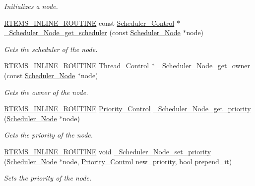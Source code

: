 \begin{DoxyCompactItemize}
\begin{DoxyCompactList}\small\item\em Initializes a node. \end{DoxyCompactList}\item 
\mbox{\hyperlink{group__RTEMSScoreBaseDefs_gac216239df231d5dbd15e3520b0b9313f}{R\+T\+E\+M\+S\+\_\+\+I\+N\+L\+I\+N\+E\+\_\+\+R\+O\+U\+T\+I\+NE}} const \mbox{\hyperlink{struct__Scheduler__Control}{Scheduler\+\_\+\+Control}} $\ast$ \mbox{\hyperlink{group__RTEMSScoreScheduler_ga5098a62702f588f64b5944aef720017d}{\+\_\+\+Scheduler\+\_\+\+Node\+\_\+get\+\_\+scheduler}} (const \mbox{\hyperlink{structScheduler__Node}{Scheduler\+\_\+\+Node}} $\ast$node)
\begin{DoxyCompactList}\small\item\em Gets the scheduler of the node. \end{DoxyCompactList}\item 
\mbox{\hyperlink{group__RTEMSScoreBaseDefs_gac216239df231d5dbd15e3520b0b9313f}{R\+T\+E\+M\+S\+\_\+\+I\+N\+L\+I\+N\+E\+\_\+\+R\+O\+U\+T\+I\+NE}} \mbox{\hyperlink{struct__Thread__Control}{Thread\+\_\+\+Control}} $\ast$ \mbox{\hyperlink{group__RTEMSScoreScheduler_ga5fb2bcc35c4d8b4ef50ecc9c41c8d6f4}{\+\_\+\+Scheduler\+\_\+\+Node\+\_\+get\+\_\+owner}} (const \mbox{\hyperlink{structScheduler__Node}{Scheduler\+\_\+\+Node}} $\ast$node)
\begin{DoxyCompactList}\small\item\em Gets the owner of the node. \end{DoxyCompactList}\item 
\mbox{\hyperlink{group__RTEMSScoreBaseDefs_gac216239df231d5dbd15e3520b0b9313f}{R\+T\+E\+M\+S\+\_\+\+I\+N\+L\+I\+N\+E\+\_\+\+R\+O\+U\+T\+I\+NE}} \mbox{\hyperlink{group__RTEMSScorePriority_ga59d02b58072d31a9a1cfe644557aefe2}{Priority\+\_\+\+Control}} \mbox{\hyperlink{group__RTEMSScoreScheduler_gaefec9c3ea8b8a7a2090d982af594f414}{\+\_\+\+Scheduler\+\_\+\+Node\+\_\+get\+\_\+priority}} (\mbox{\hyperlink{structScheduler__Node}{Scheduler\+\_\+\+Node}} $\ast$node)
\begin{DoxyCompactList}\small\item\em Gets the priority of the node. \end{DoxyCompactList}\item 
\mbox{\hyperlink{group__RTEMSScoreBaseDefs_gac216239df231d5dbd15e3520b0b9313f}{R\+T\+E\+M\+S\+\_\+\+I\+N\+L\+I\+N\+E\+\_\+\+R\+O\+U\+T\+I\+NE}} void \mbox{\hyperlink{group__RTEMSScoreScheduler_gafd0127a6831b0078ad0328740102c89d}{\+\_\+\+Scheduler\+\_\+\+Node\+\_\+set\+\_\+priority}} (\mbox{\hyperlink{structScheduler__Node}{Scheduler\+\_\+\+Node}} $\ast$node, \mbox{\hyperlink{group__RTEMSScorePriority_ga59d02b58072d31a9a1cfe644557aefe2}{Priority\+\_\+\+Control}} new\+\_\+priority, bool prepend\+\_\+it)
\begin{DoxyCompactList}\small\item\em Sets the priority of the node. \end{DoxyCompactList}\end{DoxyCompactItemize}
